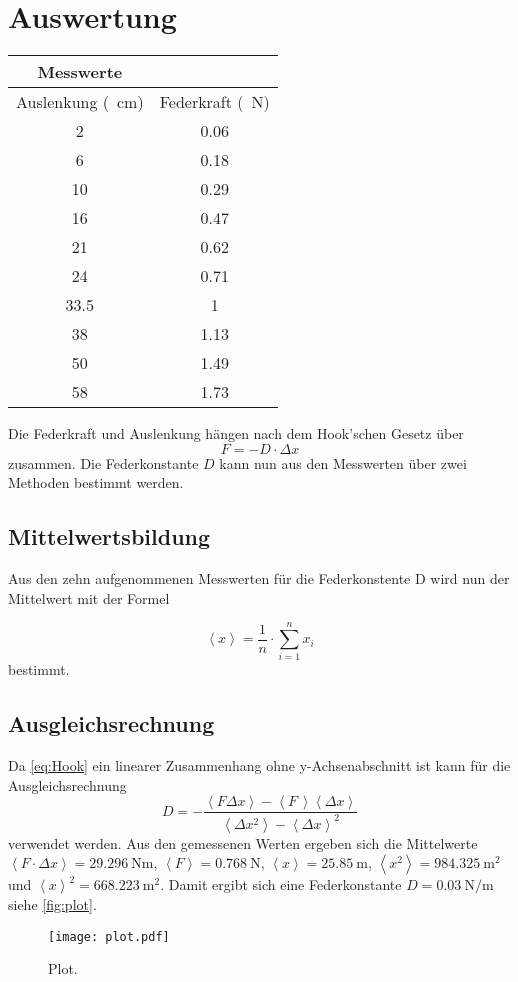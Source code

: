 \section{Auswertung}
\label{sec:Auswertung}
\begin{table}
  \centering
  \begin{tabular}{c c}
  \toprule
  Messwerte\\  
  \midrule 
  Auslenkung (\SI{}{\centi\meter}) & Federkraft (\SI{}{\newton})\\ 
  \midrule 
  2 & 0.06 \\
  6 & 0.18 \\
  10 & 0.29 \\
  16 & 0.47 \\
  21 & 0.62 \\
  24 & 0.71 \\
  33.5 & 1 \\
  38 & 1.13 \\
  50 & 1.49 \\
  58 & 1.73 \\ 
  \bottomrule
  \end{tabular}
\end{table} 
Die Federkraft und Auslenkung hängen nach dem Hook'schen Gesetz über
\begin{equation}
  \label{eq:Hook}
  F = - D \cdot \Delta x
\end{equation}
zusammen.
Die Federkonstante $D$ kann nun aus den Messwerten über zwei Methoden bestimmt werden.

\subsection{Mittelwertsbildung}
Aus den zehn aufgenommenen Messwerten für die Federkonstente D wird nun der Mittelwert mit der Formel

\begin{equation}
  \label{eq:Mittelwert}
  \left< x \right> = \frac{1}{n} \cdot \sum_{i=1}^{n} x_i
\end{equation}
bestimmt. 

\subsection{Ausgleichsrechnung}

Da \eqref{eq:Hook} ein linearer Zusammenhang ohne y-Achsenabschnitt ist kann für die Ausgleichsrechnung
\begin{equation}
  \label{eq:Lin-Ausgleich}
  D = - \frac
  {\left< F \Delta x \right> - \left< F \, \right> \left< \Delta x \right>}
  {\left< \Delta x^2 \right> - \left< \Delta x \right> ^2}
\end{equation}
verwendet werden.
Aus den gemessenen Werten ergeben sich die Mittelwerte $\left< F \cdot \Delta x \right> = \SI{29.296}{\newton\meter}$, $\left< F \right> = \SI{0.768}{\newton}$, $\left< x \right> = \SI{25.85}{\meter}$, $\left< x^2 \right> = \SI{984.325}{\meter\squared}$ und $\left< x \right> ^2 = \SI{668.223}{\meter\squared}$.
Damit ergibt sich eine Federkonstante $D=\SI{0.03}{\newton\per\meter}$ siehe \autoref{fig:plot}.

\begin{figure}
  \centering
  \texttt{[image: plot.pdf]}
  \caption{Plot.}
  \label{fig:plot}
\end{figure}

